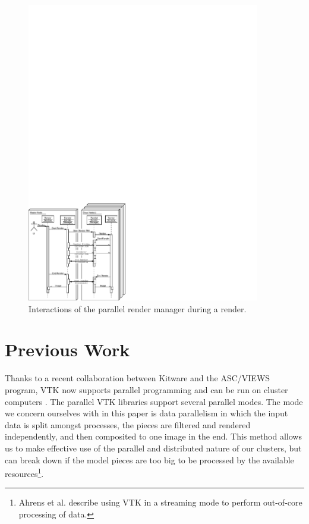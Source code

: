 \documentclass{acmsiggraph}
\begin{document}
  \begin{figure}
    \begin{center}
      \includegraphics[width=4in]
		      {images/ParallelRenderManagerInteraction}
    \end{center}
    \caption{Interactions of the parallel render manager during a render.}
    \label{fig:parallel_render_manager_interaction}
  \end{figure}


  \section{Previous Work}
  \label{sec:previous_work}

  Thanks to a recent collaboration between Kitware and the ASC/VIEWS
  program, VTK now supports parallel programming and can be run on cluster
  computers \cite{Ahrens00}.  The parallel VTK libraries support several
  parallel modes.  The mode we concern ourselves with in this paper is data
  parallelism in which the input data is split amongst processes, the
  pieces are filtered and rendered independently, and then composited to
  one image in the end.  This method allows us to make effective use of the
  parallel and distributed nature of our clusters, but can break down if
  the model pieces are too big to be processed by the available
  resources\footnote{Ahrens et al. \cite{Ahrens01} describe using VTK in a
  streaming mode to perform out-of-core processing of data.}.
\end{document}
